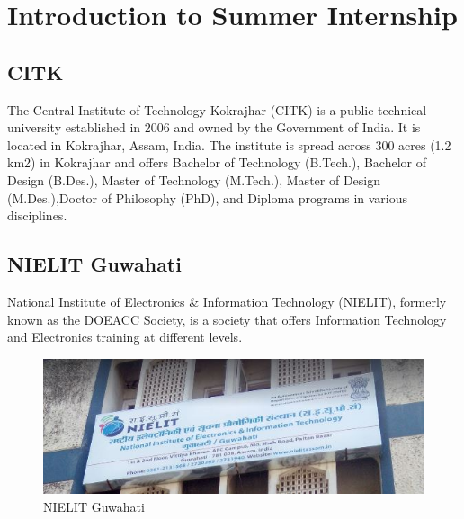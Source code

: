 
\chapter{Introduction to Summer Internship} %
\graphicspath{{Pictures/Chapter1}}
\label{Chapter 1} %


\section{CITK}
The Central Institute of Technology Kokrajhar (CITK) is a public technical university established in 2006 and owned by the Government of India. It is located in Kokrajhar, Assam, India. The institute is spread across 300 acres (1.2 km2) in Kokrajhar and offers Bachelor of Technology (B.Tech.), Bachelor of Design (B.Des.), Master of Technology (M.Tech.), Master of Design (M.Des.),Doctor of Philosophy (PhD), and Diploma programs in various disciplines.\cite{enwiki:citk}
\section{NIELIT Guwahati}
National Institute of Electronics \& Information Technology (NIELIT), formerly known as the DOEACC Society, is a society that offers Information Technology and Electronics training at different levels.

\begin{figure}[!htbp]
\centering
\includegraphics[width=15cm]{nielit.jpeg}
\caption{NIELIT Guwahati}
\label{fignielit}
\end{figure}

